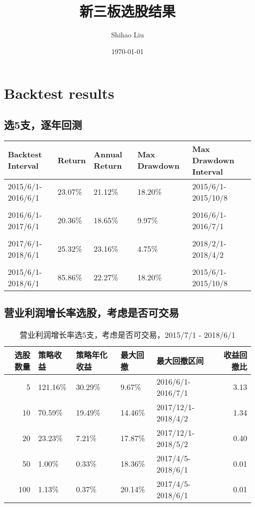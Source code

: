 \documentclass[11pt]{article}
\author{Shihao Liu}
\date{\today}
\title{新三板选股结果}
\begin{document}
\maketitle

\section{Backtest results}
\label{sec:orgadaca69}
\subsection{选5支，逐年回测}
\label{sec:org6828438}
\begin{center}
\begin{tabular}{lllll}
\hline
Backtest Interval & Return & Annual Return & Max Drawdown & Max Drawdown Interval\\
\hline
2015/6/1-2016/6/1 & 23.07\% & 21.12\% & 18.20\% & 2015/6/1-2015/10/8\\
 &  &  &  & \\
2016/6/1-2017/6/1 & 20.36\% & 18.65\% & 9.97\% & 2016/6/1-2016/7/1\\
 &  &  &  & \\
2017/6/1-2018/6/1 & 25.32\% & 23.16\% & 4.75\% & 2018/2/1-2018/4/2\\
 &  &  &  & \\
2015/6/1-2018/6/1 & 85.86\% & 22.27\% & 18.20\% & 2015/6/1-2015/10/8\\
\hline
\end{tabular}
\end{center}


\subsection{营业利润增长率选股，考虑是否可交易}
\label{sec:orgbd80eaf}
\begin{table}[H]
\caption{营业利润增长率选5支，考虑是否可交易，2015/7/1 - 2018/6/1}
\centering
\begin{tabular}{rllllr}
\hline
选股数量 & 策略收益 & 策略年化收益 & 最大回撤 & 最大回撤区间 & 收益回撤比\\
\hline
5 & 121.16\% & 30.29\% & 9.67\% & 2016/6/1-2016/7/1 & 3.13\\
10 & 70.59\% & 19.49\% & 14.46\% & 2017/12/1-2018/4/2 & 1.34\\
20 & 23.23\% & 7.21\% & 17.87\% & 2017/12/1-2018/5/2 & 0.40\\
50 & 1.00\% & 0.33\% & 18.36\% & 2017/4/5-2018/6/1 & 0.01\\
100 & 1.13\% & 0.37\% & 20.14\% & 2017/4/5-2018/6/1 & 0.01\\
\hline
\end{tabular}
\end{table}
\end{document}
